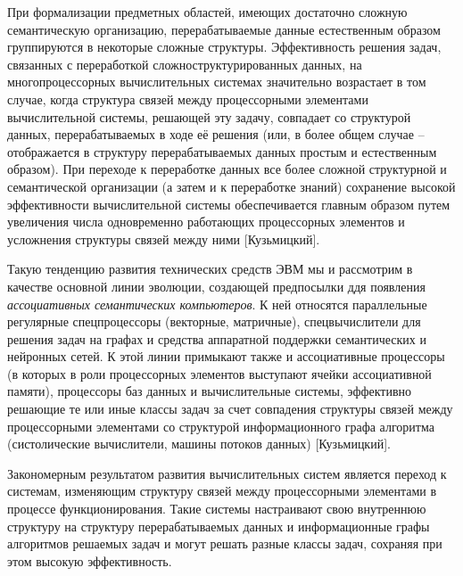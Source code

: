 При формализации предметных областей, имеющих достаточно сложную семантическую организацию, перерабатываемые данные естественным образом группируются в некоторые сложные структуры. Эффективность решения задач, связанных с переработкой сложноструктурированных данных, на многопроцессорных вычислительных системах значительно возрастает в том случае, когда структура связей между процессорными элементами вычислительной системы, решающей эту задачу, совпадает со структурой данных, перерабатываемых в ходе её решения (или, в более общем случае -- отображается в структуру перерабатываемых данных простым и естественным образом). При переходе к переработке данных все более сложной структурной и семантической организации (а затем и к переработке знаний) сохранение высокой эффективности вычислительной системы обеспечивается главным образом путем увеличения числа одновременно работающих процессорных элементов и усложнения структуры связей между ними [Кузьмицкий].

Такую тенденцию развития технических средств ЭВМ мы и рассмотрим в качестве основной линии эволюции, создающей предпосылки ддя появления \textit{ассоциативных семантических компьютеров}. К ней относятся параллельные регулярные спецпроцессоры (векторные, матричные), спецвычислители для решения задач на графах и средства аппаратной поддержки семантических и нейронных сетей. К этой линии примыкают также и ассоциативные процессоры (в которых в роли процессорных элементов выступают ячейки ассоциативной памяти), процессоры баз данных и вычислительные системы, эффективно решающие те или иные классы задач за счет совпадения структуры связей между процессорными элементами со структурой информационного графа алгоритма (систолические вычислители, машины потоков данных) [Кузьмицкий].

Закономерным результатом развития вычислительных систем является переход к системам, изменяющим структуру связей между процессорными элементами в процессе функционирования. Такие системы настраивают свою внутреннюю структуру на структуру перерабатываемых данных и информационные графы алгоритмов решаемых задач и могут решать разные классы задач, сохраняя при этом высокую эффективность.

